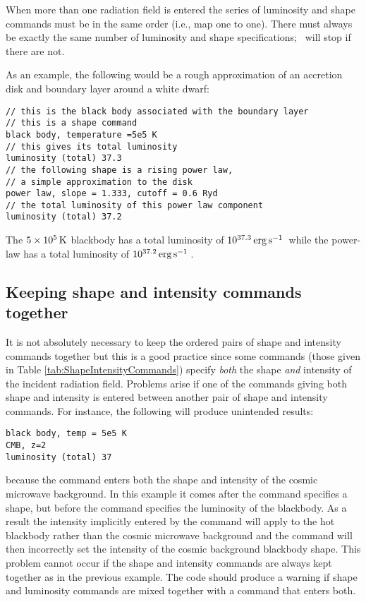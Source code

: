 When more than one radiation field is entered the series of luminosity and
shape commands must be in the same order (i.e., map one to one).  There
must always be exactly the same number of luminosity and shape
specifications; \Cloudy\ will stop if there are not.

As an example, the following would be a rough approximation of an
accretion disk and boundary layer around a white dwarf:
\begin{verbatim}
// this is the black body associated with the boundary layer
// this is a shape command
black body, temperature =5e5 K
// this gives its total luminosity 
luminosity (total) 37.3
// the following shape is a rising power law, 
// a simple approximation to the disk 
power law, slope = 1.333, cutoff = 0.6 Ryd
// the total luminosity of this power law component
luminosity (total) 37.2
\end{verbatim}
The $5\times 10^5 {\rm\thinspace K}$ blackbody has a total luminosity of
$10^{37.3} \mbox{${\rm\thinspace erg}{\rm\thinspace s}^{-1}\,$}$ while
the power-law has a total luminosity of
$10^{37.2} \mbox{${\rm\thinspace erg}{\rm\thinspace s}^{-1}\,$} $.

\subsection{Keeping shape and intensity commands together}

\noindent It is not absolutely necessary to keep
the ordered pairs of shape and
intensity commands together but this is a good practice
since some commands
(those given in Table \ref{tab:ShapeIntensityCommands})
specify \emph{both} the shape \emph{and} intensity of the incident
radiation field.
Problems arise if one of the commands giving both shape and intensity is
entered between another pair of shape and intensity commands.
For instance, the following will produce unintended results:
\begin{verbatim}
black body, temp = 5e5 K
CMB, z=2
luminosity (total) 37
\end{verbatim}
because the  command enters both the
shape and intensity of the cosmic microwave background.
In this example it comes after the  command
specifies a shape, but before the  command
specifies the luminosity of the blackbody.
As a result the intensity implicitly entered by the
command will apply to the hot blackbody rather than the cosmic
microwave background and the  command will
then incorrectly set
the intensity of the cosmic background blackbody shape.
This problem cannot
occur if the shape and intensity commands are always kept together as in
the previous example.  The code should produce a warning if shape and
luminosity commands are mixed together with a command that enters both.

